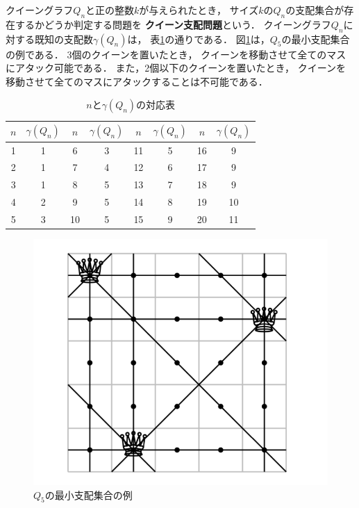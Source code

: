クイーングラフ$Q_n$と正の整数$k$が与えられたとき，
サイズ$k$の$Q_n$の支配集合が存在するかどうか判定する問題を
\textbf{クイーン支配問題}という．
クイーングラフ$Q_n$に対する既知の支配数$\gamma(Q_n)$は，
表\ref{tb:queen_n}の通りである．
図\ref{ex:queengraph5}は，$Q_5$の最小支配集合の例である．
3個のクイーンを置いたとき，
クイーンを移動させて全てのマスにアタック可能である．
また，2個以下のクイーンを置いたとき，
クイーンを移動させて全てのマスにアタックすることは不可能である．
\begin{table}[hbtp]
   \centering
   \caption{$n$と$\gamma(Q_n)$の対応表}
   \begin{tabular}{c|c||c|c||c|c||c|c} \hline
    $n$ & $\gamma(Q_{n})$ & $n$ & $\gamma(Q_{n})$ &$n$ & $\gamma(Q_{n})$ &$n$ & $\gamma(Q_{n})$ \\ \hline \hline
    1 &1 &6 &3 &11 &5 &16 &9 \\ \hline
    2 &1 &7 &4 &12 &6 &17 &9 \\ \hline
    3 &1 &8 &5 &13 &7 &18 &9 \\ \hline
    4 &2 &9 &5 &14 &8 &19 &10 \\ \hline
    5 &3 &10 &5 &15 &9 &20 &11 \\ \hline
   \end{tabular}
   \label{tb:queen_n}
  \end{table}


\begin{figure}[htb]
  \centering
  \includegraphics[width=0.6 \linewidth]{fig/fig-queen_5.pdf}
  \caption{$Q_5$の最小支配集合の例}
  \label{ex:queengraph5}
\end{figure}

